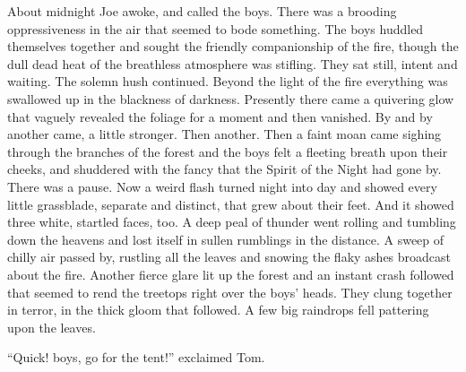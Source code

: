 \documentclass{book}
\begin{document}
About midnight Joe awoke, and called the boys. There was a brooding oppressiveness in the air that seemed to bode something. The boys huddled themselves together and sought the friendly companionship of the fire, though the dull dead heat of the breathless atmosphere was stifling. They sat still, intent and waiting. The solemn hush continued. Beyond the light of the fire everything was swallowed up in the blackness of darkness. Presently there came a quivering glow that vaguely revealed the foliage for a moment and then vanished. By and by another came, a little stronger. Then another. Then a faint moan came sighing through the branches of the forest and the boys felt a fleeting breath upon their cheeks, and shuddered with the fancy that the Spirit of the Night had gone by. There was a pause. Now a weird flash turned night into day and showed every little grassblade, separate and distinct, that grew about their feet. And it showed three white, startled faces, too. A deep peal of thunder went rolling and tumbling down the heavens and lost itself in sullen rumblings in the distance. A sweep of chilly air passed by, rustling all the leaves and snowing the flaky ashes broadcast about the fire. Another fierce glare lit up the forest and an instant crash followed that seemed to rend the treetops right over the boys’ heads. They clung together in terror, in the thick gloom that followed. A few big raindrops fell pattering upon the leaves.

“Quick! boys, go for the tent!” exclaimed Tom.
\end{document}
